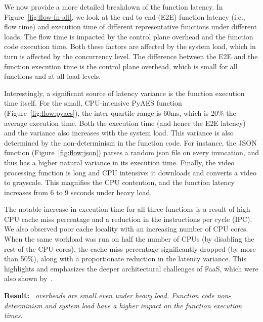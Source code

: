 We now provide a more detailed breakdown of the function latency.  
In Figure~\ref{fig:flow-fn-all}, we look at the end to end (E2E) function latency (i.e., flow time) and execution time of different representative functions under different loads.
The flow time is impacted by the control plane overhead and the function code execution time. 
Both these factors are affected by the system load, which in turn is affected by the concurrency level.
The difference between the E2E and the function execution time is the control plane overhead, which is small for all functions and at all load levels.


Interestingly, a significant source of latency variance is the function execution time itself. 
For the small, CPU-intensive PyAES function (Figure~\ref{fig:flow:pyaes}), the  inter-quartile-range is 60ms, which is 20\% the average execution time.
Both the execution time (and hence the E2E latency) and the variance also increases with the system load.
%
This variance is also determined by the non-determinism in the function code.
For instance, the JSON function (Figure~\ref{fig:flow:json}) parses a random json file on every invocation, and thus has a higher natural variance in its execution time.
%
Finally, the video processing function is long and CPU intensive: it downloads and converts a video to grayscale. 
This magnifies the CPU contention, and the function latency increases from 6 to 9 seconds under heavy load.
%


The notable increase in execution time for all three functions is a result of  high  CPU cache miss percentage and a reduction in the instructions per cycle (IPC).
%
We also observed poor cache locality with an increasing number of CPU cores. When the same workload was run on half the number of CPUs (by disabling the rest of the CPU cores), the cache miss percentage significantly dropped (by more than 50\%), along with a proportionate reduction in the latency variance.
%
This highlights and emphasizes the deeper architectural challenges of FaaS, which were also shown by~\cite{shahrad_architectural_2019}. 

\noindent \textbf{Result:} \emph{\sysname~overheads are small even under heavy load. Function code non-determinism and system load have a higher impact on the function execution times. }


